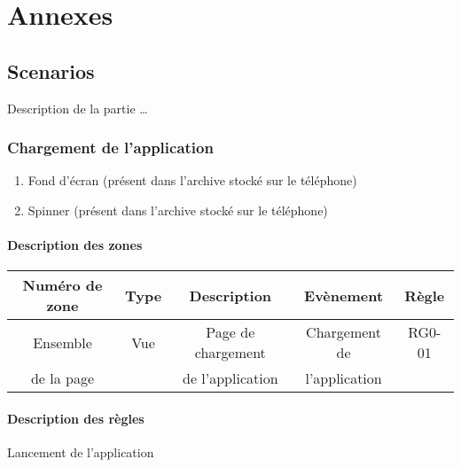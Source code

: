 \documentclass{report}
\begin{document}
\chapter{Annexes}

	\section{Scenarios}
	
		Description de la partie \ldots

\newpage
	
	\subsection{Chargement de l'application}
	
		\hypertarget{Chargement de l'application}{}
		\label{Chargement de l'application}

		\begin{center}
			
		\end{center}
		
		\begin{enumerate}
		  \item Fond d'écran (présent dans l'archive stocké sur le téléphone)
		  \item Spinner (présent dans l'archive stocké sur le téléphone)
		\end{enumerate}
		
		\subsubsection{Description des zones}

			\begin{tabular}{|c|c|c|c|c|} \hline
				Numéro de zone & Type  & Description & Evènement &	Règle \\\hline 
				Ensemble   & Vue & Page de chargement & Chargement de & RG0-01\\
				de la page &     & de l'application   & l'application &       \\\hline
			\end{tabular}
		
		\subsubsection{Description des règles}
		Lancement de l’application 
		
\end{document}
